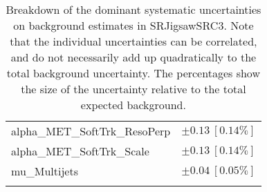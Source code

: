 \begin{table}
\begin{center}
\begin{tabular*}{\textwidth}{@{\extracolsep{\fill}}lc}
alpha\_MET\_SoftTrk\_ResoPerp         & $\pm 0.13\ [0.14\%] $       \\
alpha\_MET\_SoftTrk\_Scale         & $\pm 0.13\ [0.14\%] $       \\
mu\_Multijets         & $\pm 0.04\ [0.05\%] $       \\
\noalign{\smallskip}\hline\noalign{\smallskip}
\end{tabular*}
\end{center}
\caption[Breakdown of uncertainty on background estimates]{
Breakdown of the dominant systematic uncertainties on background estimates in SRJigsawSRC3.
Note that the individual uncertainties can be correlated, and do not necessarily add up quadratically to 
the total background uncertainty. The percentages show the size of the uncertainty relative to the total expected background.
\label{table.results.bkgestimate.uncertainties.SRJigsawSRC3}}
\end{table}
%